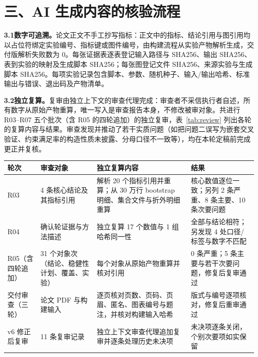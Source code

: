 \documentclass[11pt,a4paper]{article}
\renewcommand{\arraystretch}{1.12}
\begin{document}
\section*{三、AI 生成内容的核验流程}

\textbf{3.1\quad 数字可追溯。}\quad 论文正文不手工抄写指标：正文中的指标、结论引用与图引用均以占位符绑定实验编号、指标键或图件编号，由构建流程从实验产物解析生成，交付版解析失败数为 0。每张证据表逐表登记输入路径与 SHA256、输出 SHA256、表到实验的映射及生成脚本 SHA256；每张图登记文件 SHA256、来源实验与生成脚本 SHA256。每项实验记录包含脚本、参数、随机种子、输入/输出哈希、标准输出与错误、退出码及产物清单。

\textbf{3.2\quad 独立复算。}\quad 复审由独立上下文的审查代理完成：审查者不采信执行者自述，所有数字从原始产物重算，唯一写入是审查报告本身，不修改被审对象。共进行 R03--R07 五个批次（含 R05 的四轮追加）的独立复审，表~\ref{tab:review} 列出各轮的复算内容与结果。审查发现并推动了若干实质问题（如把问题二误写为嵌套交叉验证、约束满足率的构造性质未披露、分母口径不一致等），均在本轮定稿前完成更正并复核。

\begin{center}
\begin{minipage}{\linewidth}
\centering
\renewcommand{\arraystretch}{1.04}
\footnotesize
\begin{tabular}{@{}p{2.5cm}p{4.0cm}p{5.4cm}p{3.3cm}@{}}
\toprule
轮次 & 审查对象 & 独立复算内容 & 结果 \\
\midrule
R03 & 4 条核心结论及其指标引用 & 解析 20 个指标引用并重算；从 30 万行 bootstrap 明细、集合文件与折外明细重算 & 核心数值逐位一致；另列 2 条严重、8 条主要、10 条次要问题 \\
R04 & 确认轮证据与方法描述 & 独立复算 17 个数值与 1 组哈希同一性 & 全部与结论相符；另发现 4 处口径/标签与数字不匹配 \\
R05（含四轮追加） & 31 个对象次（结论、稳健性计划、覆盖、实验） & 每个对象从原始产物重算并核对引用 & 0 条严重；5 条主要与若干次要问题，修复后复审通过 \\
交付审查（三轮） & 论文 PDF 与构建输入 & 逐页核对页数、页码、页眉、匿名、图表编号与题注，并核对构建输入哈希 & 版式与编号逐项核对，修复后重审通过 \\
v6 修正后复审 & 11 条复审记录 & 独立上下文审查代理追加复审并逐条处理历史未决项 & 未决项逐条关闭，个别次要项如实保留 \\
\bottomrule
\end{tabular}
\end{minipage}
\end{center}
\end{document}
